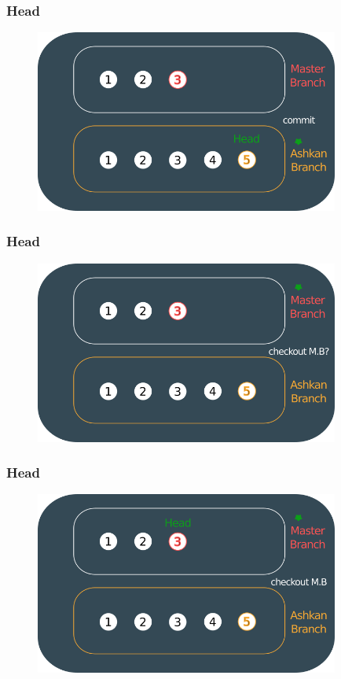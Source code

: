 \documentclass{beamer}
\begin{document}
	\begin{frame}
		\frametitle{Head}
		\begin{figure}[htbp]
			\centering
			\includegraphics[width=10cm]{head13}
		\end{figure}
	\end{frame}
	
	\begin{frame}
		\frametitle{Head}
		\begin{figure}[htbp]
			\centering
			\includegraphics[width=10cm]{head14}
		\end{figure}
	\end{frame}
	
	\begin{frame}
		\frametitle{Head}
		\begin{figure}[htbp]
			\centering
			\includegraphics[width=10cm]{head15}
		\end{figure}
	\end{frame}
	
\end{document}
